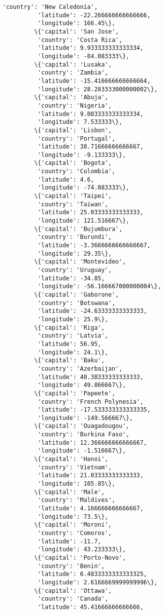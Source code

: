 \documentclass[11pt]{article}
\begin{document}
\begin{Verbatim}[commandchars=\\\{\}]
          'country': 'New Caledonia',
          'latitude': -22.266666666666666,
          'longitude': 166.45\},
         \{'capital': 'San Jose',
          'country': 'Costa Rica',
          'latitude': 9.933333333333334,
          'longitude': -84.083333\},
         \{'capital': 'Lusaka',
          'country': 'Zambia',
          'latitude': -15.416666666666664,
          'longitude': 28.283333000000002\},
         \{'capital': 'Abuja',
          'country': 'Nigeria',
          'latitude': 9.083333333333334,
          'longitude': 7.533333\},
         \{'capital': 'Lisbon',
          'country': 'Portugal',
          'latitude': 38.71666666666667,
          'longitude': -9.133333\},
         \{'capital': 'Bogota',
          'country': 'Colombia',
          'latitude': 4.6,
          'longitude': -74.083333\},
         \{'capital': 'Taipei',
          'country': 'Taiwan',
          'latitude': 25.03333333333333,
          'longitude': 121.516667\},
         \{'capital': 'Bujumbura',
          'country': 'Burundi',
          'latitude': -3.3666666666666667,
          'longitude': 29.35\},
         \{'capital': 'Montevideo',
          'country': 'Uruguay',
          'latitude': -34.85,
          'longitude': -56.166667000000004\},
         \{'capital': 'Gaborone',
          'country': 'Botswana',
          'latitude': -24.63333333333333,
          'longitude': 25.9\},
         \{'capital': 'Riga',
          'country': 'Latvia',
          'latitude': 56.95,
          'longitude': 24.1\},
         \{'capital': 'Baku',
          'country': 'Azerbaijan',
          'latitude': 40.38333333333333,
          'longitude': 49.866667\},
         \{'capital': 'Papeete',
          'country': 'French Polynesia',
          'latitude': -17.533333333333335,
          'longitude': -149.566667\},
         \{'capital': 'Ouagadougou',
          'country': 'Burkina Faso',
          'latitude': 12.366666666666667,
          'longitude': -1.516667\},
         \{'capital': 'Hanoi',
          'country': 'Vietnam',
          'latitude': 21.03333333333333,
          'longitude': 105.85\},
         \{'capital': 'Male',
          'country': 'Maldives',
          'latitude': 4.166666666666667,
          'longitude': 73.5\},
         \{'capital': 'Moroni',
          'country': 'Comoros',
          'latitude': -11.7,
          'longitude': 43.233333\},
         \{'capital': 'Porto-Novo',
          'country': 'Benin',
          'latitude': 6.4833333333333325,
          'longitude': 2.6166669999999996\},
         \{'capital': 'Ottawa',
          'country': 'Canada',
          'latitude': 45.41666666666666,

\end{Verbatim}
\end{document}
